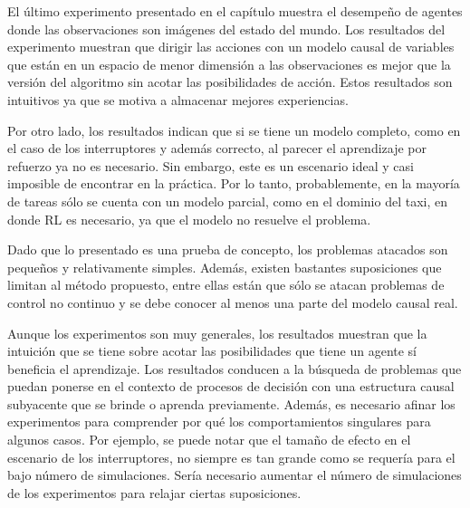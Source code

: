 El último experimento presentado en el capítulo muestra el desempeño
de agentes donde las observaciones son imágenes del estado del mundo. Los resultados del experimento muestran que dirigir las acciones
con un modelo causal de variables que están en un espacio
de menor dimensión a las observaciones es mejor que la versión del algoritmo sin 
acotar las posibilidades de acción. Estos resultados son intuitivos ya que 
se motiva a almacenar mejores experiencias.

Por otro lado, los resultados indican que si se tiene un modelo completo, como en el caso de los interruptores y además correcto, al parecer el aprendizaje por refuerzo ya no es necesario. Sin embargo, este es un escenario ideal y casi imposible de encontrar en la práctica. Por lo tanto, probablemente, en la mayoría de tareas sólo se cuenta con un modelo parcial, como en el dominio del taxi, en donde RL es necesario, ya que 
el modelo no resuelve el problema. 

Dado que lo presentado es una prueba de concepto, los problemas atacados
son pequeños y relativamente simples. Además, existen bastantes suposiciones
que limitan al método propuesto, entre ellas están que sólo se atacan problemas de control
no continuo y se debe conocer al menos una parte del modelo causal real.

Aunque los experimentos son muy generales, los resultados muestran que la intuición que se tiene sobre acotar las posibilidades que tiene un agente sí beneficia el aprendizaje.
Los resultados conducen a la búsqueda
de problemas que puedan ponerse en el contexto de procesos de decisión
con una estructura causal subyacente que se brinde o aprenda previamente. Además,
es necesario afinar los experimentos para comprender por qué los comportamientos singulares para algunos casos. Por ejemplo, se puede notar que el tamaño de efecto en el 
escenario de los interruptores, no siempre es tan grande como se requería para
el bajo número de simulaciones. Sería necesario aumentar el número de simulaciones
de los experimentos para relajar ciertas suposiciones.


